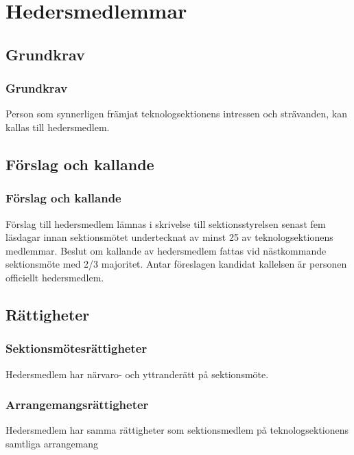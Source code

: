 \section{Hedersmedlemmar}
\label{sec:hedersmedlemmar}

\subsection{Grundkrav}

\subsubsection{Grundkrav}
Person som synnerligen främjat teknologsektionens intressen och strävanden, kan kallas till hedersmedlem.

\subsection{Förslag och kallande}

\subsubsection{Förslag och kallande}
Förslag till hedersmedlem lämnas i skrivelse till sektionsstyrelsen senast fem läsdagar innan sektionsmötet undertecknat av minst 25 av teknologsektionens medlemmar. Beslut om kallande av hedersmedlem fattas vid nästkommande sektionsmöte med 2/3 majoritet. Antar föreslagen kandidat kallelsen är personen officiellt hedersmedlem.

\subsection{Rättigheter}

\subsubsection{Sektionsmötesrättigheter}
Hedersmedlem har närvaro- och yttranderätt på sektionsmöte.

\subsubsection{Arrangemangsrättigheter}
Hedersmedlem har samma rättigheter som sektionsmedlem på teknologsektionens samtliga arrangemang